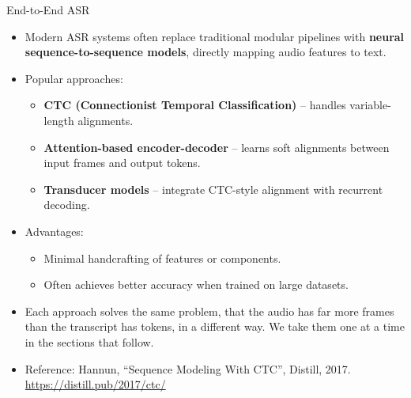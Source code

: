 \begin{frame}[allowframebreaks]{End-to-End ASR}

\begin{itemize}
    \item Modern ASR systems often replace traditional modular pipelines with \textbf{neural sequence-to-sequence models}, directly mapping audio features to text.  

    \item Popular approaches:
    \begin{itemize}
        \item \textbf{CTC (Connectionist Temporal Classification)} – handles variable-length alignments.
        \item \textbf{Attention-based encoder-decoder} – learns soft alignments between input frames and output tokens.
        \item \textbf{Transducer models} – integrate CTC-style alignment with recurrent decoding.
    \end{itemize}

    \item Advantages:
    \begin{itemize}
        \item Minimal handcrafting of features or components.
        \item Often achieves better accuracy when trained on large datasets.
    \end{itemize}

    \item Each approach solves the same problem, that the audio has far more frames than the transcript has tokens, in a different way. We take them one at a time in the sections that follow.

    \item Reference: Hannun, ``Sequence Modeling With CTC'', Distill, 2017. \url{https://distill.pub/2017/ctc/}
\end{itemize}

\end{frame}


